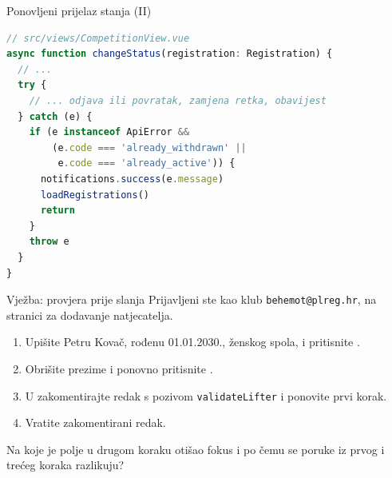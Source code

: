 \begin{frame}[fragile]{Ponovljeni prijelaz stanja (II)}
\begin{lstlisting}[language=typescript]
// src/views/CompetitionView.vue
async function changeStatus(registration: Registration) {
  // ...
  try {
    // ... odjava ili povratak, zamjena retka, obavijest
  } catch (e) {
    if (e instanceof ApiError &&
        (e.code === 'already_withdrawn' ||
         e.code === 'already_active')) {
      notifications.success(e.message)
      loadRegistrations()
      return
    }
    throw e
  }
}
\end{lstlisting}
\end{frame}

\begin{frame}{Vježba: provjera prije slanja}
Prijavljeni ste kao klub \texttt{behemot@plreg.hr}, na stranici za dodavanje natjecatelja.

\vspace{0.8em}
\begin{enumerate}
  \itemsep0.4em
  \item Upišite Petru Kovač, rođenu 01.01.2030., ženskog spola, i pritisnite .
  \item Obrišite prezime i ponovno pritisnite .
  \item U  zakomentirajte redak s pozivom \texttt{validateLifter} i ponovite prvi korak.
  \item Vratite zakomentirani redak.
\end{enumerate}

\vspace{0.8em}
Na koje je polje u drugom koraku otišao fokus i po čemu se poruke iz prvog i trećeg koraka razlikuju?
\end{frame}

